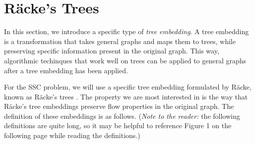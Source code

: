 \documentclass[12pt]{article}
\newtheorem{definition}{Definition}
\begin{document}
%
%

\section{R\"{a}cke's Trees}
\label{sec:rackestrees}

In this section, we introduce a specific type of \emph{tree embedding}. A tree embedding is a transformation that takes general graphs and maps them to trees, while preserving specific information present in the original graph. This way, algorithmic techinques that work well on trees can be applied to general graphs after a tree embedding has been applied. 

For the SSC problem, we will use a specific tree embedding formulated by R\"{a}cke, known as R\"{a}cke's trees \cite{racke}. The property we are most interested in is the way that R\"{a}cke's tree embeddings preserve flow properties in the original graph. The definition of these embeddings is as follows. (\emph{Note to the reader:} the following definitions are quite long, so it may be helpful to reference Figure 1 on the following page while reading the definitions.)
\end{document}
